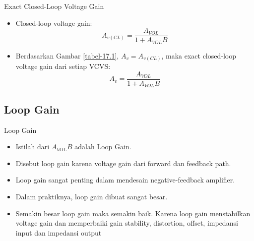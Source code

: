 \begin{frame}{Exact Closed-Loop Voltage Gain}
	\begin{itemize}
		\item Closed-loop voltage gain:
		\begin{equation}\label{pers-17.02}
			A_{v(CL)} = \frac{A_{VOL}}{1 + A_{VOL}B}
		\end{equation}
		\item Berdasarkan Gambar \ref{tabel-17.1}, $ A_v = A_{v(CL)} $, maka exact closed-loop voltage gain dari setiap VCVS:
		\begin{equation}\label{pers-17.03}
			A_v = \frac{A_{VOL}}{1 + A_{VOL}B}
		\end{equation}
	\end{itemize}
\end{frame}

\subsection{Loop Gain}
\begin{frame}{Loop Gain}
	\begin{itemize}
		\item Istilah dari $ A_{VOL} B$ adalah Loop Gain.
		\item Disebut loop gain karena voltage gain dari forward dan feedback path.
		\item Loop gain sangat penting dalam mendesain negative-feedback amplifier.
		\item Dalam praktiknya, loop gain dibuat sangat besar.
		\item Semakin besar loop gain maka semakin baik. Karena loop gain menstabilkan voltage gain dan memperbaiki gain stability, distortion, offset, impedansi input dan impedansi output
	\end{itemize}
\end{frame}

